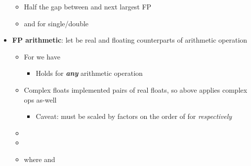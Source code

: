 \begin{itemize}
\begin{itemize}
          \item
                Half the gap between  and next largest FP
          \item
                 and
                 for single/double
        \end{itemize}
  \item
        \textbf{FP arithmetic}: let \iMbox{\ast, \circledast} be real and
        floating counterparts of arithmetic operation

        \begin{itemize}

          \item
                For  we have

                \begin{itemize}

                  \item
                        Holds for \textbf{\emph{any}} arithmetic operation
                        \iMbox{\circledast = \oplus, \ominus, \otimes, \oslash}
                \end{itemize}
          \item
                Complex floats implemented pairs of real floats, so above applies
                complex ops as-well

                \begin{itemize}

                  \item
                        Caveat: 
                        must be scaled by factors on the order of 
                        for \iMbox{\otimes, \oslash} \emph{respectively}
                \end{itemize}
          \item
          \item
          \item
                where
                and


\end{itemize}
\end{itemize}
